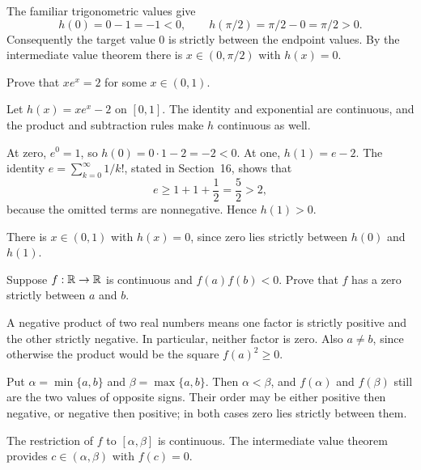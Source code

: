 The familiar trigonometric values give
\[
 h(0)=0-1=-1<0,\qquad
 h(\pi/2)=\pi/2-0=\pi/2>0.
\]
Consequently the target value $0$ is strictly between the
endpoint values. By the intermediate value theorem there is
$x\in(0,\pi/2)$ with $h(x)=0$.

\goal Prove that $xe^x=2$ for some $x\in(0,1)$.

Let $h(x)=xe^x-2$ on $[0,1]$. The identity and exponential
are continuous, and the product and subtraction rules make
$h$ continuous as well.

At zero, $e^0=1$, so $h(0)=0\cdot1-2=-2<0$.
At one, $h(1)=e-2$. The identity
$e=\sum_{k=0}^{\infty}1/k!$, stated in Section~16,
shows that
\[
 e\ge1+1+\frac12=\frac52>2,
\]
because the omitted terms are nonnegative. Hence $h(1)>0$.

There is $x\in(0,1)$ with $h(x)=0$, since zero lies strictly
between $h(0)$ and $h(1)$.

\goal Suppose $f:\mathbb{R}\to\mathbb{R}$ is continuous and
$f(a)f(b)<0$. Prove that $f$ has a zero strictly between
$a$ and $b$.

A negative product of two real numbers means one factor is
strictly positive and the other strictly negative. In particular,
neither factor is zero. Also $a\ne b$, since otherwise the
product would be the square $f(a)^2\ge0$.

Put $\alpha=\min\{a,b\}$ and $\beta=\max\{a,b\}$.
Then $\alpha<\beta$, and $f(\alpha)$ and $f(\beta)$ still
are the two values of opposite signs. Their order may be either
positive then negative, or negative then positive; in both cases
zero lies strictly between them.

The restriction of $f$ to $[\alpha,\beta]$ is continuous.
The intermediate value theorem provides $c\in(\alpha,\beta)$
with $f(c)=0$.

